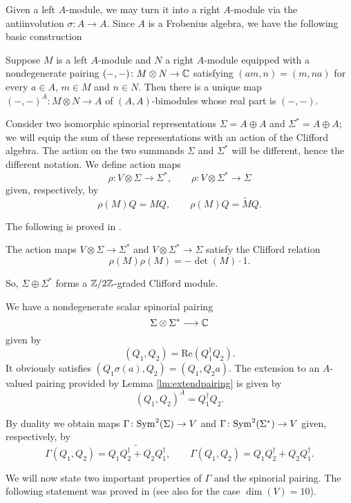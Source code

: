 \documentclass[10pt, oneside]{article}
\renewcommand{\Re}{\mathrm{Re}}
\begin{document}
Given a left $A$-module, we may turn it into a right $A$-module via the antiinvolution $\sigma\colon A\rightarrow A$. Since $A$ is a Frobenius algebra, we have the following basic construction 

\begin{lemma}
Suppose $M$ is a left $A$-module and $N$ a right $A$-module equipped with a nondegenerate pairing $(-, -)\colon M\otimes N\rightarrow \mathbb C$ satisfying $(am, n) = (m, na)$ for every $a\in A$, $m\in M$ and $n\in N$. Then there is a unique map $(-, -)^A\colon M\otimes N\rightarrow A$ of $(A, A)$-bimodules whose real part is $(-, -)$.
\label{lm:extendpairing}
\end{lemma}

Consider two isomorphic spinorial representations $\Sigma=A\oplus A$ and $\Sigma^* = A\oplus A$; we will equip the sum of these representations with an action of the Clifford algebra.  The action on the two summands $\Sigma$ and $\Sigma^*$ will be different, hence the different notation.  We define action maps
\[\rho \colon V \otimes \Sigma\rightarrow \Sigma^*,\qquad \rho \colon V\otimes \Sigma^*\rightarrow \Sigma\]
given, respectively, by
\[\rho(M)Q = M Q,\qquad \rho(M)Q = \widetilde{M} Q.\]

The following is proved in \cite[Proposition 6]{BaezHuerta}.

\begin{prop}
The action maps $V\otimes \Sigma\rightarrow \Sigma^*$ and $V\otimes \Sigma^*\rightarrow \Sigma$ satisfy the Clifford relation
\[\rho(M)\rho(M) = -\det(M)\cdot 1.\]
\end{prop}

So, $\Sigma\oplus \Sigma^*$ forms a $\mathbb Z/2\mathbb Z$-graded Clifford module.

We have a nondegenerate scalar spinorial pairing
\[\Sigma\otimes \Sigma^*\longrightarrow \mathbb C\]
given by
\[(Q_1, Q_2) = \Re(Q_1^\dagger Q_2).\]
It obviously satisfies $(Q_1 \sigma(a), Q_2) = (Q_1, Q_2 a)$. The extension to an $A$-valued pairing provided by Lemma \ref{lm:extendpairing} is given by
\[(Q_1, Q_2)^A = Q_1^\dagger Q_2.\]

By duality we obtain maps $\Gamma\colon{\rm Sym}^2(\Sigma)\rightarrow V$ and $\Gamma\colon {\rm Sym}^2(\Sigma^*)\rightarrow V$ given, respectively, by
\[\Gamma(Q_1, Q_2) = \widetilde{Q_1Q_2^\dagger + Q_2Q_1^\dagger},\qquad \Gamma(Q_1, Q_2) = Q_1Q_2^\dagger + Q_2Q_1^\dagger.\]

We will now state two important properties of $\Gamma$ and the spinorial pairing. The following statement was proved in \cite[Theorem 11]{BaezHuerta} (see also \cite{Schray} for the case $\dim(V)=10$).
\end{document}
